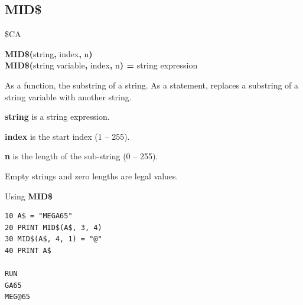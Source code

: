 \subsection{MID\$}
\begin{description}[leftmargin=2cm,style=nextline]
\item [Token:]    \$CA

\item [Format:]   {\bf MID\$(}string{\bf,} index{\bf,} n{\bf)} \\
                  {\bf MID\$(}string variable{\bf,} index{\bf,} n{\bf) =} string expression

\item [Usage:]    As a function, the substring of a string. As a statement, replaces a substring of a string variable with another string.

                  {\bf string} is a string expression.

                  {\bf index} is the start index (1 -- 255).

                  {\bf n} is the length of the sub-string (0 -- 255).

\item [Remarks:]  Empty strings and zero lengths are legal values.

\item [Example:]  Using {\bf MID\$}

\begin{tcolorbox}[colback=black,coltext=white]
\verbatimfont{\codefont}
\begin{verbatim}
10 A$ = "MEGA65"
20 PRINT MID$(A$, 3, 4)
30 MID$(A$, 4, 1) = "@"
40 PRINT A$

RUN
GA65
MEG@65
\end{verbatim}
\end{tcolorbox}
\end{description}


\newpage
